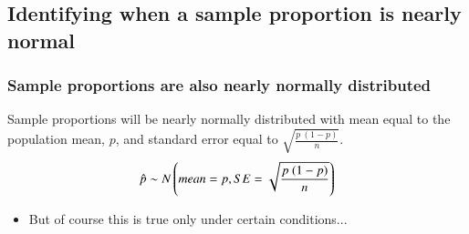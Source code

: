
\subsection{Identifying when a sample proportion is nearly normal}


\begin{frame}
\frametitle{Sample proportions are also nearly normally distributed}

{
Sample proportions will be nearly normally distributed with mean equal to the population mean, $p$, and standard error equal to $\sqrt{\frac{p~(1-p)}{n}}$.
\[ \hat{p} \sim N \left(  mean = p, SE = \sqrt{\frac{p~(1-p)}{n}}  \right) \]
}

\begin{itemize}

\item But of course this is true only under certain conditions...



\pause
\vfill


\end{itemize}

\end{frame}


%
%
%
%

